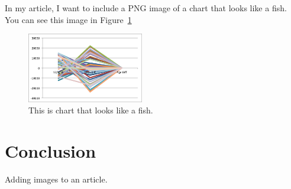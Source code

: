 \documentclass{proc}
\begin{document}
        In my article, I want to include a PNG image of a chart that looks like a fish. You can see this image in Figure~\ref{fig:fish}

        \begin{figure}[htbp]
            \begin{center}
                \includegraphics[width=2in]{src/examples/assets/img/Fish.png}
                \caption{This is chart that looks like a fish.}
            \end{center}
            \label{fig:fish}
        \end{figure}


    \section{Conclusion}

    Adding images to an article.
\end{document}
